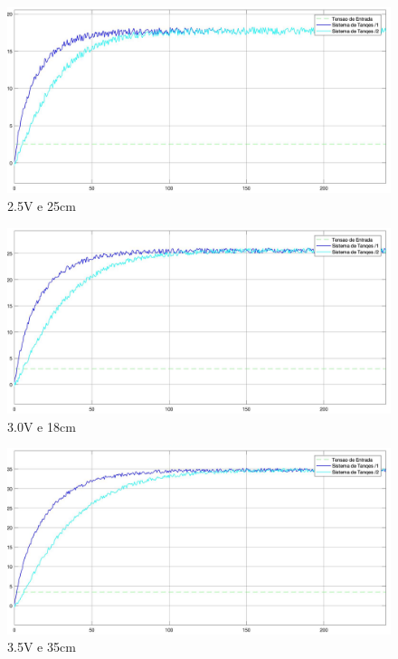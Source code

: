 \documentclass[a4paper,12pt]{article}
\begin{document}
\begin{figure}[H]
	\centering
	\includegraphics[scale=0.20]{./imagens/exp1/V25.jpg}
	\caption{2.5V e 25cm }
\end{figure}

\begin{figure}[H]
	\centering
	\includegraphics[scale=0.20]{./imagens/exp1/V30.jpg}
	\caption{3.0V e 18cm }
\end{figure}

\begin{figure}[H]
	\centering
	\includegraphics[scale=0.20]{./imagens/exp1/V35.jpg}
	\caption{3.5V e 35cm }
\end{figure}
\end{document}
